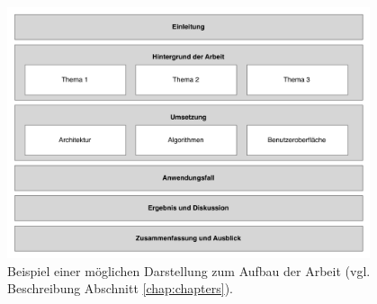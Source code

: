 \begin{figure}[!ht]
	\centering
		\includegraphics[width=0.95\textwidth]{pics/structure.pdf}
	\caption[Beispiel einer möglichen Darstellung zum Aufbau der Arbeit]{Beispiel einer möglichen Darstellung zum Aufbau der Arbeit (vgl. Beschreibung Abschnitt  \ref{chap:chapters}).} 
	\label{fig:structurethesis}
\end{figure}